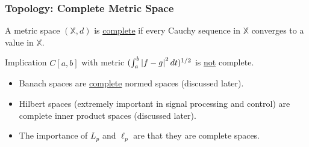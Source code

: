 \documentclass{beamer}
\begin{document}
\begin{frame}\frametitle{Topology: Complete Metric Space}

\begin{definition}
A metric space $(\mathbb{X},d)$ is \underline{complete} if every Cauchy sequence in $\mathbb{X}$ converges to a value in $\mathbb{X}$.\\
\end{definition}

\begin{block}{Implication}
 $C[a,b]$ with metric $(\int_{a}^{b}\left|f-g\right|^2 dt)^{1/2}$ is \underline{not} complete.	
\end{block}

\begin{itemize}
\item Banach spaces are \underline{complete} normed spaces (discussed later).
\item Hilbert spaces (extremely important in signal processing and control) are complete inner product spaces (discussed later).
\item The importance of $L_p$ and $\ell_p$ are that they are complete spaces.
\end{itemize}

%
%
%
\end{frame}
\end{document}
